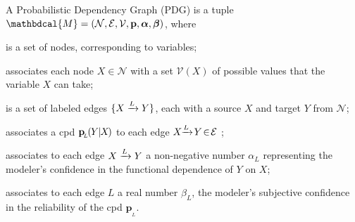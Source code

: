 \documentclass[twoside]{article}
\theoremstyle{plain}
\theoremstyle{definition}
\newcommand{\mat}[1]{\mathbf{#1}}
\newcommand{\ssub}[1]{_{\!_{#1}\!}}
\newcommand{\bp}[1][L]{\mat{p}\ssub{#1}}
\newcommand{\V}{\mathcal V}
\newcommand{\N}{\mathcal N}
\newcommand{\Ed}{\mathcal E}
\newcommand{\dg}[1]{\mathbdcal{#1}}
\newcommand{\ed}[3]{%
		\mathchoice%
		{#2\overset{\smash{\mskip-5mu\raisebox{-3pt}{${#1}$}}}{\xrightarrow{\hphantom{\scriptstyle {#1}}}} #3} %
		{#2\overset{\smash{\mskip-5mu\raisebox{-3pt}{$\scriptstyle {#1}$}}}{\xrightarrow{\hphantom{\scriptstyle {#1}}}} #3}%
		{#2\overset{\smash{\mskip-5mu\raisebox{-3pt}{$\scriptscriptstyle {#1}$}}}{\xrightarrow{\hphantom{\scriptscriptstyle {#1}}}} #3} %
		{#2\overset{\smash{\mskip-5mu\raisebox{-3pt}{$\scriptscriptstyle {#1}$}}}{\xrightarrow{\hphantom{\scriptscriptstyle {#1}}}} #3}} %
\begin{document}
\begin{defn}
    \label{defn:pdg}
	A Probabilistic Dependency Graph (PDG) is a tuple $\dg M = (\N,\Ed,\V,\mat p, \boldsymbol\alpha, \boldsymbol\beta)$, where
    \vspace{-1em}
	\begin{description}[leftmargin=1em,labelindent=1.5em,itemsep=0pt]
		\item[$\N$]
			is a set of nodes, corresponding to variables;
        \item[$\V$]
			associates each node $X \in \N$ with a set $\V(X)$ of possible values that the variable $X$ can take;
		\item[$\Ed$]
			is a set of labeled  edges $\{ \ed LXY \}$, each with a source
			$X$ and target $Y$ from $\N$;

		\item[$\mat p$]
		associates
        a cpd $\bp(\mskip-1muY\mskip-1mu|\mskip-1muX\mskip-2mu)$
        to each edge $\ed L{X\!\!}{\!Y} \!\in\! \Ed$%
        ;
	\item[$\boldsymbol\alpha$]
	associates to each edge $\ed L{X}{Y}$ a non-negative number $\alpha_L$
    representing
    the modeler's confidence in the functional dependence of $Y$ on $X$;

	\item[$\boldsymbol\beta$]
	associates to each edge $L$ a real number $\beta_L$,
	the modeler's subjective confidence in the reliability of
	the cpd
	$\bp$.%
    \qedhere
	\end{description}%
\end{defn}
\end{document}
